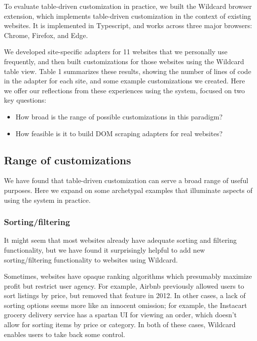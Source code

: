 \documentclass[sigplan,screen,10pt,anonymous,review]{acmart}
\providecommand{\tightlist}{%
  \setlength{\itemsep}{0pt}\setlength{\parskip}{0pt}}
\begin{document}
To evaluate table-driven customization in practice, we built the
Wildcard browser extension, which implements table-driven customization
in the context of existing websites. It is implemented in Typescript,
and works across three major browsers: Chrome, Firefox, and Edge.

We developed site-specific adapters for 11 websites that we personally
use frequently, and then built customizations for those websites using
the Wildcard table view. Table 1 summarizes these results, showing the
number of lines of code in the adapter for each site, and some example
customizations we created. Here we offer our reflections from these
experiences using the system, focused on two key questions:

\begin{itemize}
\tightlist
\item
  How broad is the range of possible customizations in this paradigm?
\item
  How feasible is it to build DOM scraping adapters for real websites?
\end{itemize}

\hypertarget{range-of-customizations}{%
\subsection{Range of customizations}\label{range-of-customizations}}

We have found that table-driven customization can serve a broad range of
useful purposes. Here we expand on some archetypal examples that
illuminate aspects of using the system in practice.

\hypertarget{sortingfiltering}{%
\subsubsection{Sorting/filtering}\label{sortingfiltering}}

It might seem that most websites already have adequate sorting and
filtering functionality, but we have found it surprisingly helpful to
add new sorting/filtering functionality to websites using Wildcard.

Sometimes, websites have opaque ranking algorithms which presumably
maximize profit but restrict user agency. For example, Airbnb previously
allowed users to sort listings by price, but removed that feature in
2012. In other cases, a lack of sorting options seems more like an
innocent omission; for example, the Instacart grocery delivery service
has a spartan UI for viewing an order, which doesn't allow for sorting
items by price or category. In both of these cases, Wildcard enables
users to take back some control.
\end{document}
